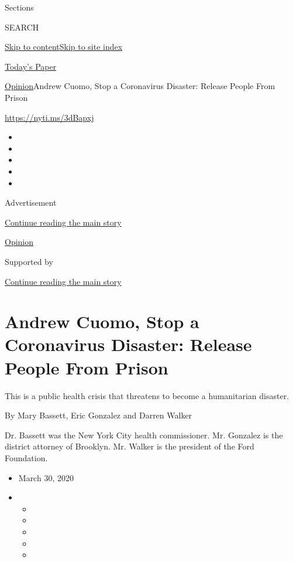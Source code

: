 Sections

SEARCH

\protect\hyperlink{site-content}{Skip to
content}\protect\hyperlink{site-index}{Skip to site index}

\href{https://myaccount.nytimes3xbfgragh.onion/auth/login?response_type=cookie\&client_id=vi}{}

\href{https://www.nytimes3xbfgragh.onion/section/todayspaper}{Today's
Paper}

\href{/section/opinion}{Opinion}\textbar{}Andrew Cuomo, Stop a
Coronavirus Disaster: Release People From Prison

\url{https://nyti.ms/3dBapxj}

\begin{itemize}
\item
\item
\item
\item
\item
\end{itemize}

Advertisement

\protect\hyperlink{after-top}{Continue reading the main story}

\href{/section/opinion}{Opinion}

Supported by

\protect\hyperlink{after-sponsor}{Continue reading the main story}

\hypertarget{andrew-cuomo-stop-a-coronavirus-disaster-release-people-from-prison}{%
\section{Andrew Cuomo, Stop a Coronavirus Disaster: Release People From
Prison}\label{andrew-cuomo-stop-a-coronavirus-disaster-release-people-from-prison}}

This is a public health crisis that threatens to become a humanitarian
disaster.

By Mary Bassett, Eric Gonzalez and Darren Walker

Dr. Bassett was the New York City health commissioner. Mr. Gonzalez is
the district attorney of Brooklyn. Mr. Walker is the president of the
Ford Foundation.

\begin{itemize}
\item
  March 30, 2020
\item
  \begin{itemize}
  \item
  \item
  \item
  \item
  \item
  \end{itemize}
\end{itemize}

